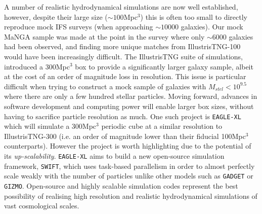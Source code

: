 A number of realistic hydrodynamical simulations are now well established, however, despite their large size ($\sim 100$Mpc$^3$) this is often too small to directly reproduce mock IFS surveys (when approaching $\sim 10000$ galaxies). Our mock MaNGA sample was made at the point in the survey where only $\sim$6000 galaxies had been observed, and finding more unique matches from IllustrisTNG-100 would have been increasingly difficult. The IllustrisTNG suite of simulations, introduced a 300Mpc$^3$ box to provide a significantly larger galaxy sample, albeit at the cost of an order of magnitude loss in resolution. This issue is particular difficult when trying to construct a mock sample of galaxies with $M_{stel} < 10^{9.5}$ where there are only a few hundred stellar particles. Moving forward, advances in software development and computing power will enable larger box sizes, without having to sacrifice particle resolution as much. One such project is \texttt{EAGLE-XL} which will simulate a 300Mpc$^{3}$ periodic cube at a similar resolution to IllustrisTNG-300 (i.e. an order of magnitude lower than their fiducial 100Mpc$^3$ counterparts). However the project is worth highlighting due to the potential of its \textit{up-scalability}. \texttt{EAGLE-XL} aims to build a new open-source simulation framework, \texttt{SWIFT}, which uses task-based parallelism in order to almost perfectly scale weakly with the number of particles unlike other models such as \texttt{GADGET} or \texttt{GIZMO}. Open-source and highly scalable simulation codes represent the best possibility of realising high resolution and realistic hydrodynamical simulations of vast cosmological scales. 
